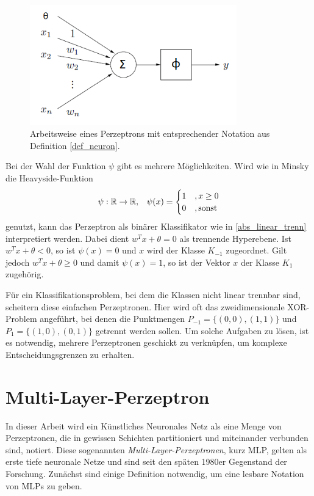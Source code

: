 \begin{figure}[h]
    \includegraphics[width=0.8\textwidth]{pics/chapter_neuralnetworks/perzeptron.png}
    \centering
    \caption{Arbeitsweise eines Perzeptrons mit entsprechender Notation aus Definition \ref{def_neuron}.}
    \label{funktionsweise_neuron}
\end{figure}

Bei der Wahl der Funktion $\psi$ gibt es mehrere Möglichkeiten. Wird wie in Minsky\cite{minsky2017perceptrons} die Heavyside-Funktion
\begin{equation*}
    \psi: \mathbb{R} \rightarrow \mathbb{R}, \; \; \;
    \psi(x)=\begin{cases}
       1 &, x \geq 0 \\
       0 &, \text{sonst}
    \end{cases}
\end{equation*} 
genutzt, kann das Perzeptron als binärer Klassifikator wie in \ref{abs_linear_trenn} interpretiert werden. Dabei dient $w^Tx+\theta=0$ als trennende Hyperebene. Ist $w^Tx+\theta<0$, so ist $\psi(x)=0$ und $x$ wird der Klasse $K_{-1}$ zugeordnet. Gilt jedoch $w^Tx+\theta \geq 0$ und damit $\psi(x)=1$, so ist der Vektor $x$ der Klasse $K_1$ zugehörig. 

Für ein Klassifikationsproblem, bei dem die Klassen nicht linear trennbar sind, scheitern diese einfachen Perzeptronen. Hier wird oft das zweidimensionale XOR-Problem angeführt, bei denen die Punktmengen $P_{-1}=\{(0,0),(1,1)\}$ und $P_{1}=\{(1,0),(0,1)\}$ getrennt werden sollen. Um solche Aufgaben zu lösen, ist es notwendig, mehrere Perzeptronen geschickt zu verknüpfen, um komplexe Entscheidungsgrenzen zu erhalten.

\section{Multi-Layer-Perzeptron}
\label{MLP_abs}
In dieser Arbeit wird ein Künstliches Neuronales Netz als eine Menge von Perzeptronen, die in gewissen Schichten partitioniert und miteinander verbunden sind, notiert. Diese sogenannten \textit{Multi-Layer-Perzeptronen}, kurz MLP,  gelten als erste tiefe neuronale Netze und sind seit den späten 1980er Gegenstand der Forschung\cite{bourlard1990links,bounds1988multilayer,MLPbook}. Zunächst sind einige Definition notwendig, um eine lesbare Notation von MLPs zu geben.

